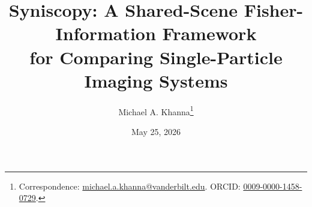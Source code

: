 \documentclass[11pt,a4paper]{article}
\title{Syniscopy: A Shared-Scene Fisher-Information Framework\\
       for Comparing Single-Particle Imaging Systems}
\author{Michael A. Khanna\thanks{Correspondence:
  \href{mailto:michael.a.khanna@vanderbilt.edu}{michael.a.khanna@vanderbilt.edu}.
  ORCID: \href{https://orcid.org/0009-0000-1458-0729}{0009-0000-1458-0729}.}}
\date{May 25, 2026}
\theoremstyle{remark}
\begin{document}
\maketitle

\begin{abstract}

\end{abstract}












\end{document}
